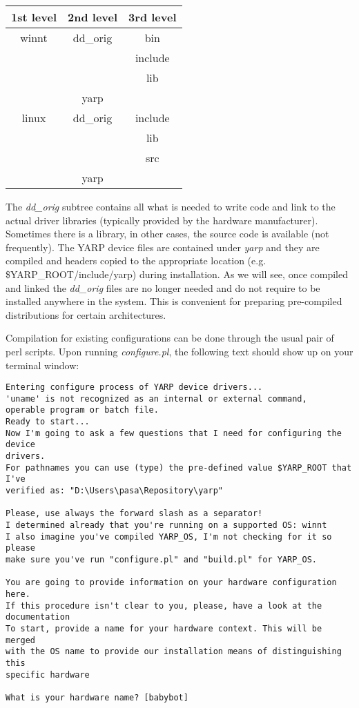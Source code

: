 \begin{table}[h]
	\centering
		\begin{tabular}{|c|c|c|}
		\hline
			1st level & 2nd level & 3rd level \\
			\hline \hline
			winnt & dd\_orig & bin \\
			 &  & include \\
			 &  & lib \\
			 & yarp & \\
			\hline
			linux & dd\_orig & include \\
			 &  & lib \\
			 &  & src \\
			 & yarp & \\
			\hline
		\end{tabular}
\end{table}

The {\em dd\_orig} subtree contains all what is needed to write code and link to the actual driver libraries (typically provided by the hardware manufacturer). Sometimes there is a library, in other cases, the source code is available (not frequently). The YARP device files are contained under {\em yarp} and they are compiled and headers copied to the appropriate location (e.g. \$YARP\_ROOT/include/yarp) during installation. As we will see, once compiled and linked the {\em dd\_orig} files are no longer needed and do not require to be installed anywhere in the system. This is convenient for preparing pre-compiled distributions for certain architectures.

Compilation for existing configurations can be done through the usual pair of perl scripts. Upon running {\em configure.pl}, the following text should show up on your terminal window:

\begin{verbatim}
Entering configure process of YARP device drivers...
'uname' is not recognized as an internal or external command,
operable program or batch file.
Ready to start...
Now I'm going to ask a few questions that I need for configuring the device 
drivers.
For pathnames you can use (type) the pre-defined value $YARP_ROOT that I've 
verified as: "D:\Users\pasa\Repository\yarp"

Please, use always the forward slash as a separator!
I determined already that you're running on a supported OS: winnt
I also imagine you've compiled YARP_OS, I'm not checking for it so please 
make sure you've run "configure.pl" and "build.pl" for YARP_OS.

You are going to provide information on your hardware configuration here. 
If this procedure isn't clear to you, please, have a look at the 
documentation
To start, provide a name for your hardware context. This will be merged 
with the OS name to provide our installation means of distinguishing this 
specific hardware

What is your hardware name? [babybot]
\end{verbatim}

